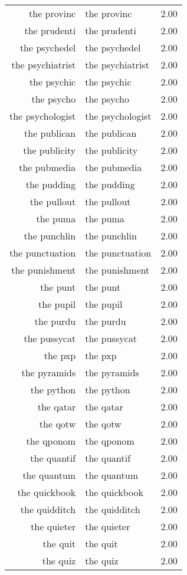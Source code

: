 \begin{table}[ht]
\begin{tabular}{rlr}
  the provinc & the provinc & 2.00 \\ 
  the prudenti & the prudenti & 2.00 \\ 
  the psychedel & the psychedel & 2.00 \\ 
  the psychiatrist & the psychiatrist & 2.00 \\ 
  the psychic & the psychic & 2.00 \\ 
  the psycho & the psycho & 2.00 \\ 
  the psychologist & the psychologist & 2.00 \\ 
  the publican & the publican & 2.00 \\ 
  the publicity & the publicity & 2.00 \\ 
  the pubmedia & the pubmedia & 2.00 \\ 
  the pudding & the pudding & 2.00 \\ 
  the pullout & the pullout & 2.00 \\ 
  the puma & the puma & 2.00 \\ 
  the punchlin & the punchlin & 2.00 \\ 
  the punctuation & the punctuation & 2.00 \\ 
  the punishment & the punishment & 2.00 \\ 
  the punt & the punt & 2.00 \\ 
  the pupil & the pupil & 2.00 \\ 
  the purdu & the purdu & 2.00 \\ 
  the pussycat & the pussycat & 2.00 \\ 
  the pxp & the pxp & 2.00 \\ 
  the pyramids & the pyramids & 2.00 \\ 
  the python & the python & 2.00 \\ 
  the qatar & the qatar & 2.00 \\ 
  the qotw & the qotw & 2.00 \\ 
  the qponom & the qponom & 2.00 \\ 
  the quantif & the quantif & 2.00 \\ 
  the quantum & the quantum & 2.00 \\ 
  the quickbook & the quickbook & 2.00 \\ 
  the quidditch & the quidditch & 2.00 \\ 
  the quieter & the quieter & 2.00 \\ 
  the quit & the quit & 2.00 \\ 
  the quiz & the quiz & 2.00 \\ 

\end{tabular}
\end{table}
